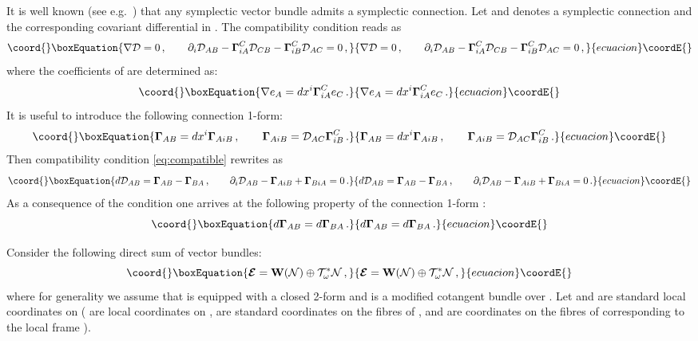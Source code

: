 \documentclass[a4paper,11pt]{amsart}
\numberwithin{thm}{section} %
\numberwithin{equation}{section} %
\numberwithin{figure}{section} %
\renewcommand{\:}{{\rm\, :\,}}
\def\d{\partial}
\def\mod{{\mathcal T}^*_\omega}
\def\manN{{\mathcal N}}
\def\E{{ \mathcal E}}
\def\W{{\bf W}}
\def\mcon{{\boldsymbol\Gamma}}
\def\mD{\mathcal{D}}
\def\mE{{\boldsymbol{\E}}}
\def\mnabla{\mathfrak{\nabla}}
\begin{document}
It is well known (see e.g.~\cite{[Fedosov-book]}) that any symplectic
vector bundle admits a symplectic connection.  Let \myHighlight{$\mcon$}\coordHE{} and
\myHighlight{$\mnabla$}\coordHE{} denotes a symplectic connection and the corresponding covariant
differential in \myHighlight{$\W(\manN)$}\coordHE{}. The compatibility condition reads as
\begin{equation}\coord{}\boxEquation{
\label{eq:compatible}
  \mnabla \mD=0\,,  \qquad \d_i \mD_{AB} - \mcon^C_{iA}\mD_{CB}-\mcon^C_{iB}\mD_{AC}=0\,,
}{
\mnabla \mD=0\,,  \qquad \d_i \mD_{AB} - \mcon^C_{iA}\mD_{CB}-\mcon^C_{iB}\mD_{AC}=0\,,
}{ecuacion}\coordE{}\end{equation}
where the coefficients \myHighlight{$\mcon^C_{iA}$}\coordHE{} of \myHighlight{$\mcon$}\coordHE{} are determined
as:
\begin{equation}\coord{}\boxEquation{
  \mnabla e_A=dx^i \mcon^C_{iA}e_C\,.
}{
  \mnabla e_A=dx^i \mcon^C_{iA}e_C\,.
}{ecuacion}\coordE{}\end{equation}
It is useful to introduce the following connection 1-form:
\begin{equation}\coord{}\boxEquation{
\mcon_{AB}=dx^i \mcon_{AiB}\,, \qquad  \mcon_{AiB}=\mD_{AC}\mcon^C_{iB}\,.
}{
\mcon_{AB}=dx^i \mcon_{AiB}\,, \qquad  \mcon_{AiB}=\mD_{AC}\mcon^C_{iB}\,.
}{ecuacion}\coordE{}\end{equation}
Then compatibility condition \eqref{eq:compatible} rewrites as
\begin{equation}\coord{}\boxEquation{
\label{eq:compatible-l}
d\mD_{AB}=\mcon_{AB}-\mcon_{BA}\,, \qquad  \d_i \mD_{AB} - \mcon_{AiB}+\mcon_{BiA}=0\,.
}{
d\mD_{AB}=\mcon_{AB}-\mcon_{BA}\,, \qquad  \d_i \mD_{AB} - \mcon_{AiB}+\mcon_{BiA}=0\,.
}{ecuacion}\coordE{}\end{equation}
As a consequence of the condition one arrives at the following
property of the connection 1-form \myHighlight{$\mcon_{AB}$}\coordHE{}:
\begin{equation}\coord{}\boxEquation{
\label{eq:dC-symm}
  d\mcon_{AB}=d\mcon_{BA}\,.
}{
d\mcon_{AB}=d\mcon_{BA}\,.
}{ecuacion}\coordE{}\end{equation}


Consider the following direct sum of vector bundles:
\begin{equation}\coord{}\boxEquation{
  \mE=\W(\manN) \oplus \mod\manN\,,
}{
  \mE=\W(\manN) \oplus \mod\manN\,,
}{ecuacion}\coordE{}\end{equation}
where for generality we assume that \myHighlight{$\manN$}\coordHE{} is equipped with a closed
2-form \myHighlight{$\omega$}\coordHE{} and \myHighlight{$\mod\manN$}\coordHE{} is a modified cotangent bundle
over \myHighlight{$\manN$}\coordHE{}.  Let \coordHE{} and \coordHE{} are standard local coordinates
on \myHighlight{$\mE$}\coordHE{} (\coordHE{} are local coordinates on \myHighlight{$\manN$}\coordHE{}, \coordHE{} are standard
coordinates on the fibres of \myHighlight{$\mod\manN$}\coordHE{}, and \coordHE{} are coordinates on
the fibres of \myHighlight{$\W(\manN)$}\coordHE{} corresponding to the local frame \coordHE{}).
\end{document}
